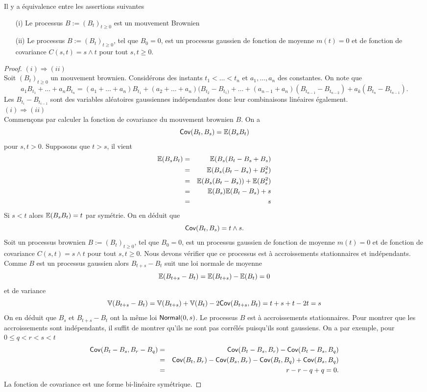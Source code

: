 \begin{prop}
Il y a équivalence entre les assertions suivantes 
\begin{itemize}
  \item[(i)] Le processus $B:=(B_t)_{t\geq 0}$ est un mouvement Brownien
  \item[(ii)] Le processus $B:=(B_t)_{t\geq 0}$, tel que $B_0 = 0$, est un processus gaussien de fonction de moyenne $m(t) = 0$ et de fonction de covariance $C(s,t) = s\land t$ pour tout $s,t\geq 0$.
\end{itemize}
\end{prop}
\begin{proof}
$(i)\Rightarrow (ii)$ \\
Soit $(B_t)_{t\geq0}$ un mouvement brownien. Considérons des instants $t_1<\ldots < t_n$ et $a_1,\ldots, a_n$ des constantes. On note que 
$$
a_1B_{t_1}+\ldots + a_n B_{t_n} = (a_1+\ldots + a_n)B_{t_1}+(a_2+\ldots + a_n)(B_{t_2}-B_{t_1)}+\ldots+(a_{n-1}+ a_{n})(B_{t_{n-1}}- B_{t_{n-2}})+ a_k(B_{t_n}- B_{t_{n-1}}).
$$
Les $B_{t_i}- B_{t_{i-1}}$ sont des variables aléatoires gaussiennes indépendantes donc leur combinaisons linéaires également. \\

$(i)\Rightarrow (ii)$ \\
Commençons par calculer la fonction de covariance du mouvement brownien $B$. On a 
$$\mathsf{Cov}(B_t, B_s) = \mathbb{E}(B_sB_t)$$
pour $s,t>0$. Supposons que $t>s$, il vient 
\begin{eqnarray*}
\mathbb{E}(B_sB_t) &= &\mathbb{E}(B_s(B_t-B_s + B_s)\\
&= &\mathbb{E}(B_s(B_t-B_s) + B_s^2)\\
&= &\mathbb{E}(B_s(B_t-B_s)) + \mathbb{E}(B_s^2)\\
&= &\mathbb{E}(B_s)\mathbb{E}(B_t-B_s) + s\\
&= & s\\
\end{eqnarray*}
Si $s<t$ alors $\mathbb{E}(B_sB_t) = t$ par symétrie. On en déduit que 
$$
\mathsf{Cov}(B_t, B_s) = t\land s.
$$
Soit un processus brownien $B:=(B_t)_{t\geq 0}$, tel que $B_0 = 0$, est un processus gaussien de fonction de moyenne $m(t) = 0$ et de fonction de covariance $C(s,t) = s\land t$ pour tout $s,t\geq 0$. Nous devons vérifier que ce processus est à accroissements stationnaires et indépendants. Comme $B$ est un processus gaussien alors $B_{t+s}- B_t$ suit une loi normale de moyenne 
$$
\mathbb{E}(B_{t+s}- B_t) =\mathbb{E}(B_{t+s})- \mathbb{E}(B_t) = 0
$$
et de variance 
$$
\mathbb{V}(B_{t+s}- B_t) = \mathbb{V}(B_{t+s}) + \mathbb{V}(B_t) - 2\mathsf{Cov}(B_{t+s}, B_{t}) = t+s + t - 2 t = s
$$
On en déduit que $B_s$ et $B_{t+s}-B_{t}$ ont la même loi $\mathsf{Normal}(0, s)$. Le processus $B$ est à accroissements stationnaires. Pour montrer que les accroissements sont indépendants, il suffit de montrer qu'ils ne sont pas corrélés puisqu'ils sont gaussiens. On a par exemple, pour $0\leq q<r<s<t$ 
\begin{eqnarray*}
\mathsf{Cov}(B_t-B_s, B_r-B_q) &=& \mathsf{Cov}(B_t-B_s, B_r) - \mathsf{Cov}(B_t-B_s, B_q)\\
&=& \mathsf{Cov}(B_t, B_r) - \mathsf{Cov}(B_s, B_r) - \mathsf{Cov}(B_t, B_q) + \mathsf{Cov}(B_s, B_q)\\
&=& r -r -q+q=0.
\end{eqnarray*}
La fonction de covariance est une forme bi-linéaire symétrique.
\end{proof}
